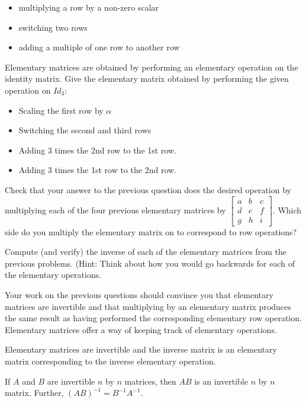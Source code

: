\begin{itemize}
\item multiplying a row by a non-zero scalar
\item switching two rows
\item adding a multiple of one row to another row
\end{itemize}
Elementary matrices are obtained by performing an elementary operation on the identity matrix.
\bq Give the elementary matrix obtained by performing the given operation on $Id_3$:
\begin{itemize}
\item Scaling the first row by $\alpha$
\item Switching the second and third rows
\item Adding 3 times the 2nd row to the 1st row.
\item Adding 3 times the 1st row to the 2nd row.
\end{itemize}
\eq

\bq Check that your answer to the previous question does the desired operation by multiplying each of the four previous elementary matrices by $\begin{bmatrix} a&b&c\\d&e&f\\g&h&i \end{bmatrix}$. Which side do you multiply the elementary matrix on to correspond to row operations?
\eq

\bq Compute (and verify) the inverse of each of the elementary matrices from the previous problems. (Hint: Think about how you would go backwards for each of the elementary operations.
\eq

Your work on the previous questions should convince you that elementary matrices are invertible and that multiplying by an elementary matrix produces the same result as having performed the corresponding elementary row operation. Elementary matrices offer a way of keeping track of elementary operations.
\begin{theorem}
Elementary matrices are invertible and the inverse matrix is an elementary matrix corresponding to the inverse elementary operation.
\end{theorem}

\begin{theorem}
If $A$ and $B$ are invertible $n$ by $n$ matrices, then $AB$ is an invertible $n$ by $n$ matrix. Further, $(AB)^{-1} =B^{-1}A^{-1}$.
\end{theorem}

